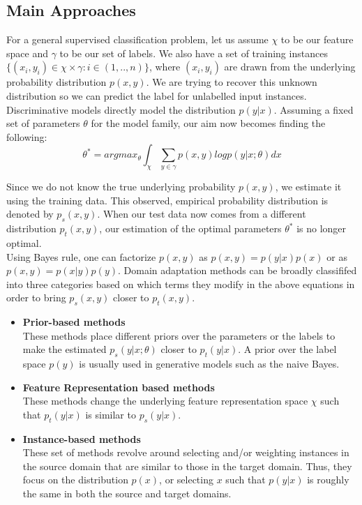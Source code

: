\documentclass[12pt]{report}
\begin{document}
	\subsection{Main Approaches}
	For a general supervised classification problem, let us assume $\chi$ to be our feature space and $\gamma$ to be our set of labels. We also have a set of training instances $\{(x_{i}, y_{i}) \in \chi \times \gamma: i \in (1,..,n)\}$, where $(x_{i}, y_{i})$ are drawn from the underlying probability distribution $p(x,y)$. We are trying to recover this unknown distribution so we can predict the label for unlabelled input instances. Discriminative models directly model the distribution $p(y|x)$. Assuming a fixed set of parameters $\theta$ for the model family, our aim now becomes finding the following:
	\[
		\theta^{*} = argmax_{\theta} \int_{\chi} \sum_{y \in \gamma} p(x,y) log p(y|x;\theta)dx 
	\]
	
	Since we do not know the true underlying probability $p(x,y)$, we estimate it using the training data. This observed, empirical probability distribution is denoted by $p_{s}(x,y)$. When our test data now comes from a different distribution $p_{t}(x,y)$, our estimation of the optimal parameters $\theta^{*}$ is no longer optimal. \\
	Using Bayes rule, one can factorize $p(x,y)$ as $p(x,y) = p(y|x)p(x)$ or as $p(x,y) = p(x|y)p(y)$. Domain adaptation methods can be broadly classififed into three categories based on which terms they modify in the above equations in order to bring $p_{s}(x,y)$ closer to $p_{t}(x,y)$. 
	\begin{itemize}
		\item \textbf{Prior-based methods} \\
		These methods place different priors over the parameters or the labels to make the estimated $p_{s}(y|x;\theta)$ closer to $p_{t}(y|x)$. A prior over the label space $p(y)$ is usually used in generative models such as the naive Bayes.
		
		\item \textbf{Feature Representation based methods} \\ These methods change the underlying feature representation space $\chi$ such that $p_{t}(y|x)$ is similar to $p_{s}(y|x)$. 
		\item \textbf{Instance-based methods} \\
		These set of methods revolve around selecting and/or weighting instances in the source domain that are similar to those in the target domain. Thus, they focus on the distribution $p(x)$, or selecting $x$ such that $p(y|x)$ is roughly the same in both the source and target domains. 
	\end{itemize} 
\end{document}
